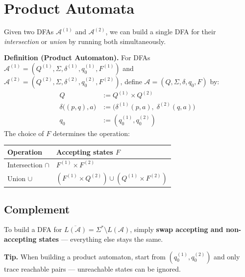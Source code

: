 \documentclass[11pt, a4paper]{article}
\theoremstyle{definition}
\theoremstyle{remark}
\newcommand{\dfa}{\mathcal{A}}
\begin{document}
\section{Product Automata}

Given two DFAs $\dfa^{(1)}$ and $\dfa^{(2)}$, we can build a single DFA for their
\emph{intersection} or \emph{union} by running both simultaneously.

\begin{defbox}
\textbf{Definition (Product Automaton).}
For DFAs $\dfa^{(1)}=(Q^{(1)},\Sigma,\delta^{(1)},q_0^{(1)},F^{(1)})$ and
$\dfa^{(2)}=(Q^{(2)},\Sigma,\delta^{(2)},q_0^{(2)},F^{(2)})$,
define $\dfa=(Q,\Sigma,\delta,q_0,F)$ by:
\begin{align*}
  Q &:= Q^{(1)}\times Q^{(2)} \\
  \delta\bigl((p,q),a\bigr) &:= \bigl(\delta^{(1)}(p,a),\;\delta^{(2)}(q,a)\bigr) \\
  q_0 &:= (q_0^{(1)},q_0^{(2)})
\end{align*}
The choice of $F$ determines the operation:
\begin{center}
\begin{tabular}{ll}
  \toprule
  Operation & Accepting states $F$ \\
  \midrule
  Intersection $\cap$ & $F^{(1)}\times F^{(2)}$ \\
  Union $\cup$        & $(F^{(1)}\times Q^{(2)})\cup(Q^{(1)}\times F^{(2)})$ \\
  \bottomrule
\end{tabular}
\end{center}
\end{defbox}

\subsection{Complement}

To build a DFA for $\overline{L(\dfa)}=\Sigma^*\setminus L(\dfa)$, simply \textbf{swap
accepting and non-accepting states} --- everything else stays the same.

\begin{insightbox}
\textbf{Tip.}  When building a product automaton, start from $(q_0^{(1)},q_0^{(2)})$ and
only trace reachable pairs --- unreachable states can be ignored.
\end{insightbox}

\end{document}
